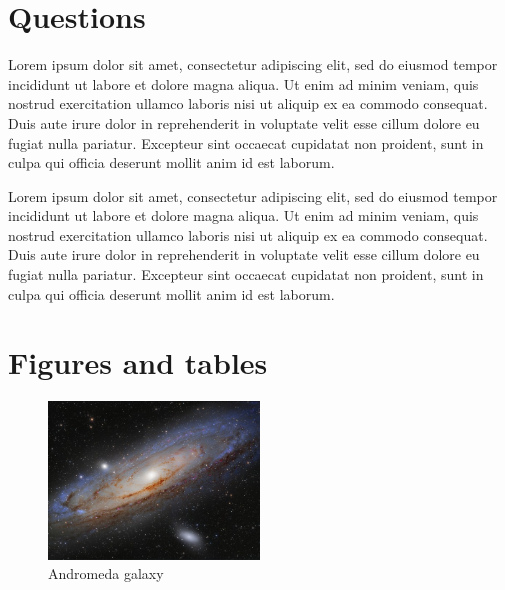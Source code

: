 \documentclass[12pt,a4paper]{report}
\begin{document}

\section{Questions}

Lorem ipsum dolor sit amet, consectetur adipiscing elit, sed do eiusmod tempor incididunt ut labore et dolore magna aliqua. Ut enim ad minim veniam, quis nostrud exercitation ullamco laboris nisi ut aliquip ex ea commodo consequat. Duis aute irure dolor in reprehenderit in voluptate velit esse cillum dolore eu fugiat nulla pariatur. Excepteur sint occaecat cupidatat non proident, sunt in culpa qui officia deserunt mollit anim id est laborum.

Lorem ipsum dolor sit amet, consectetur adipiscing elit, sed do eiusmod tempor incididunt ut labore et dolore magna aliqua. Ut enim ad minim veniam, quis nostrud exercitation ullamco laboris nisi ut aliquip ex ea commodo consequat. Duis aute irure dolor in reprehenderit in voluptate velit esse cillum dolore eu fugiat nulla pariatur. Excepteur sint occaecat cupidatat non proident, sunt in culpa qui officia deserunt mollit anim id est laborum.


\section{Figures and tables}

\begin{figure}[hbtp!]
  \centering
  \includegraphics[width=0.5\textwidth]{media/m31}
  \caption{Andromeda galaxy}
    \label{fig:m31}
\end{figure}
\end{document}
